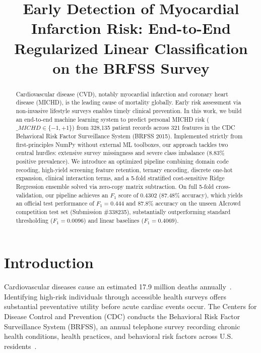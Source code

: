 \documentclass[10pt,conference,compsocconf]{IEEEtran}
\begin{document}
\title{Early Detection of Myocardial Infarction Risk: End-to-End Regularized Linear Classification on the BRFSS Survey}

\author{
}

\maketitle

\begin{abstract}
Cardiovascular disease (CVD), notably myocardial infarction and coronary heart disease (MICHD), is the leading cause of mortality globally. Early risk assessment via non-invasive lifestyle surveys enables timely clinical prevention. In this work, we build an end-to-end machine learning system to predict personal MICHD risk ($\_MICHD \in \{-1, +1\}$) from 328,135 patient records across 321 features in the CDC Behavioral Risk Factor Surveillance System (BRFSS 2015). Implemented strictly from first-principles NumPy without external ML toolboxes, our approach tackles two central hurdles: extensive survey missingness and severe class imbalance (8.83\% positive prevalence). We introduce an optimized pipeline combining domain code recoding, high-yield screening feature retention, ternary encoding, discrete one-hot expansion, clinical interaction terms, and a 5-fold stratified cost-sensitive Ridge Regression ensemble solved via zero-copy matrix subtraction. On full 5-fold cross-validation, our pipeline achieves an $F_1$ score of 0.4302 (87.48\% accuracy), which yields an official test performance of $F_1 = 0.444$ and 87.8\% accuracy on the unseen AIcrowd competition test set (Submission \#338235), substantially outperforming standard thresholding ($F_1 = 0.0096$) and linear baselines ($F_1 = 0.4069$).
\end{abstract}

\section{Introduction}
Cardiovascular diseases cause an estimated 17.9 million deaths annually~\cite{who2021cvd}. Identifying high-risk individuals through accessible health surveys offers substantial preventative utility before acute cardiac events occur. The Centers for Disease Control and Prevention (CDC) conducts the Behavioral Risk Factor Surveillance System (BRFSS), an annual telephone survey recording chronic health conditions, health practices, and behavioral risk factors across U.S. residents~\cite{cdc2015brfss}.
\end{document}
